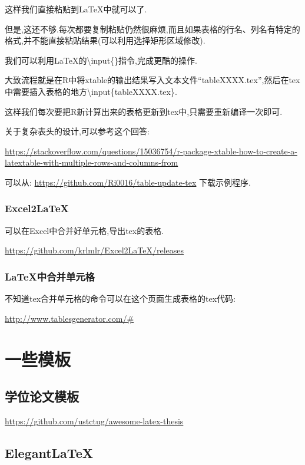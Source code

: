 \documentclass[]{ctexbook}
\begin{document}
这样我们直接粘贴到LaTeX中就可以了.

但是,这还不够.每次都要复制粘贴仍然很麻烦,而且如果表格的行名、列名有特定的格式,并不能直接粘贴结果(可以利用选择矩形区域修改).

我们可以利用LaTeX的\textbackslash{}input\{\}指令,完成更酷的操作.

大致流程就是在R中将xtable的输出结果写入文本文件``tableXXXX.tex'',然后在tex中需要插入表格的地方\textbackslash{}input\{tableXXXX.tex\}.

这样我们每次要把R新计算出来的表格更新到tex中,只需要重新编译一次即可.

关于复杂表头的设计,可以参考这个回答:

\url{https://stackoverflow.com/questions/15036754/r-package-xtable-how-to-create-a-latextable-with-multiple-rows-and-columns-from}

可以从:
\url{https://github.com/Ri0016/table-update-tex}
下载示例程序.

\hypertarget{excel2latex}{%
\subsection{Excel2LaTeX}\label{excel2latex}}

可以在Excel中合并好单元格,导出tex的表格.

\url{https://github.com/krlmlr/Excel2LaTeX/releases}

\hypertarget{latex}{%
\subsection{LaTeX中合并单元格}\label{latex}}

不知道tex合并单元格的命令可以在这个页面生成表格的tex代码:

\url{http://www.tablesgenerator.com/\#}

\hypertarget{template}{%
\chapter{一些模板}\label{template}}

\hypertarget{section-25}{%
\section{学位论文模板}\label{section-25}}

\url{https://github.com/ustctug/awesome-latex-thesis}

\hypertarget{elegantlatex}{%
\section{ElegantLaTeX}\label{elegantlatex}}
\end{document}

